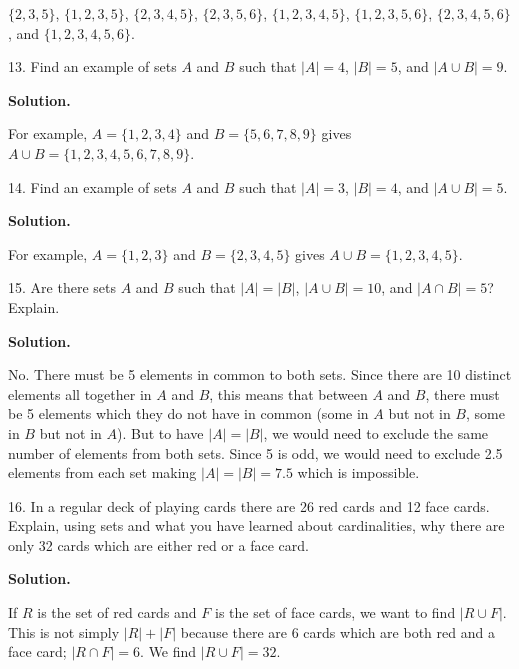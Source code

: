 \documentclass[10pt,]{book}
\theoremstyle{plain}
\theoremstyle{definition}
\theoremstyle{definition}
\theoremstyle{definition}
\begin{document}
\begin{exerciselist}
          \(\{2,3,5\}\), \(\{1,2,3,5\}\), \(\{2,3,4,5\}\), \(\{2,3,5,6\}\), \(\{1,2,3,4,5\}\), \(\{1,2,3,5,6\}\), \(\{2,3,4,5,6\}\), and \(\{1,2,3,4,5,6\}\).
\item[13.]\hypertarget{exercise-23}{}
          Find an example of sets \(A\) and \(B\) such that \(|A| = 4\), \(|B| = 5\), and \(|A \cup B| = 9\).
\par\smallskip
\par\smallskip
\noindent\textbf{Solution.}\hypertarget{solution-35}{}\quad

          For example, \(A = \{1,2,3,4\}\) and \(B = \{5,6,7,8,9\}\) gives \(A \cup B = \{1,2,3,4,5,6,7,8,9\}\).
\item[14.]\hypertarget{exercise-24}{}
          Find an example of sets \(A\) and \(B\) such that \(|A| = 3\), \(|B| = 4\), and \(|A \cup B| = 5\).
\par\smallskip
\par\smallskip
\noindent\textbf{Solution.}\hypertarget{solution-36}{}\quad

          For example, \(A = \{1,2,3\}\) and \(B = \{2,3,4,5\}\) gives \(A\cup B = \{1,2,3,4,5\}\).
\item[15.]\hypertarget{exercise-25}{}
          Are there sets \(A\) and \(B\) such that \(|A| = |B|\), \(|A\cup B| = 10\), and \(|A\cap B| = 5\)? Explain.
\par\smallskip
\par\smallskip
\noindent\textbf{Solution.}\hypertarget{solution-37}{}\quad

          No. There must be 5 elements in common to both sets. Since there are 10 distinct elements all together in \(A\) and \(B\), this means that between \(A\) and \(B\), there must be 5 elements which they do not have in common (some in \(A\) but not in \(B\), some in \(B\) but not in \(A\)). But to have \(|A| = |B|\), we would need to exclude the same number of elements from both sets.  Since 5 is odd, we would need to exclude 2.5 elements from each set making \(|A| = |B| = 7.5\) which is impossible.
\item[16.]\hypertarget{exercise-26}{}
          In a regular deck of playing cards there are 26 red cards and 12 face cards. Explain, using sets and what you have learned about cardinalities, why there are only 32 cards which are either red or a face card.
\par\smallskip
\par\smallskip
\noindent\textbf{Solution.}\hypertarget{solution-38}{}\quad

          If \(R\) is the set of red cards and \(F\) is the set of face cards, we want to find \(|R \cup F|\). This is not simply \(|R| + |F|\) because there are 6 cards which are both red and a face card; \(|R \cap F| = 6\). We find
          \(|R \cup F| = 32\).
\end{exerciselist}
\typeout{************************************************}
\typeout{************************************************}
\end{document}
